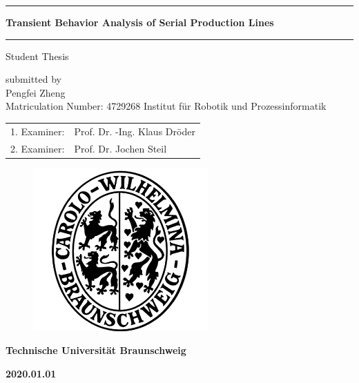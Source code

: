 \documentclass[ifn,english,masterarbeit,pdf,cd]{report}
\begin{document}
\large {}
\begin{titlepage}
    \setcounter{page}{1}
    \let\footnotesize\small
    \let\footnoterule\relax
    \headsep 1.5cm
    \vskip -2cm
    \begin{center}
    	\rule[1\baselineskip]{\textwidth}{1pt}
    	\LARGE\bf Transient Behavior Analysis of Serial Production Lines
    	\baselineskip
    	\rule[1\baselineskip]{\textwidth}{1pt}
    \end{center}   
    \begin{center}        
               {\Large{Student Thesis\\}\par}
                \vskip 0.25cm
                {\large submitted by\\}
                \vskip 0.25cm
                {\Large Pengfei Zheng\\ \large Matriculation Number: 4729268}
                \vskip 0.8cm
                {\large Institut f\"{u}r Robotik und Prozessinformatik}                       
    \end{center}
\linespread{1.5}
\begin{table}[!h]
	\centering	
	\begin{tabular}{rl}
		\large	1. Examiner:& \large Prof. Dr. -Ing. Klaus Dr\"{o}der \\
		\large2. Examiner:& \large Prof. Dr. Jochen Steil \\
	\end{tabular}
\end{table}
    \begin{figure}[!h]
        \begin{center}
            \includegraphics[width=0.3\linewidth]{carolo.jpg}
        \end{center}
    \end{figure}
\centerline{\large\bf Technische Universit\"{a}t Braunschweig}
\vskip 1cm
\centerline{\large\bf 2020.01.01}

\end{titlepage}
\end{document}
